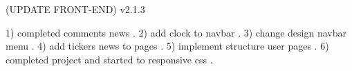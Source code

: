 (UPDATE FRONT-END) v2.1.3

1) completed comments news .
2) add clock to navbar .
3) change design navbar menu .
4) add tickers news to pages .
5) implement structure user pages .
6) completed project and started to responsive css .
